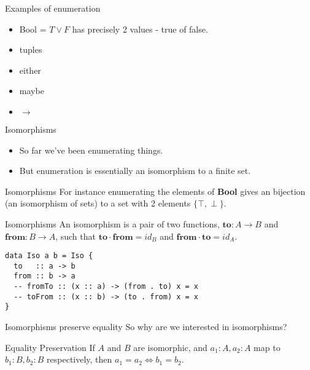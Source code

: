 \documentclass[tikz]{beamer}
\theoremstyle{definition}
\begin{document}
\begin{frame}{Examples of enumeration}

    \begin{itemize}
    	\item Bool = $T \lor F$ has precisely 2 values - true of false.
	\item tuples
	\item either
	\item maybe
	\item $\to$
    \end{itemize}

\end{frame}{}

\begin{frame}{Isomorphisms}
	\begin{itemize}
	\item So far we've been enumerating things.
	\item But enumeration is essentially an isomorphism to a finite set.
	\end{itemize}
\end{frame}

\begin{frame}{Isomorphisms}
	For instance enumerating the elements of \textbf{Bool} gives an bijection (an isomorphism of sets) to a set with 2 elements $\{\top, \perp\}$.
\end{frame}

\begin{frame}[fragile]{Isomorphisms}
An isomorphism is a pair of two functions, $\mathbf{to}: A \to B$ and $\mathbf{from}: B \to A$, such that $\mathbf{to} \cdot \mathbf{from} = id_B$ and $\mathbf{from} \cdot \mathbf{to} = id_A$.

\begin{verbatim}
data Iso a b = Iso {
  to   :: a -> b
  from :: b -> a
  -- fromTo :: (x :: a) -> (from . to) x = x
  -- toFrom :: (x :: b) -> (to . from) x = x
}
\end{verbatim}
\end{frame}

\begin{frame}[fragile]{Isomorphisms preserve equality}
So why are we interested in isomorphisms?

\begin{block}{Equality Preservation}
    If $A$ and $B$ are isomorphic, and $a_1: A, a_2: A$ map to $b_1: B, b_2: B$ respectively, then $a_1 = a_2 \iff b_1 = b_2$.
\end{block}
\end{frame}
\end{document}
